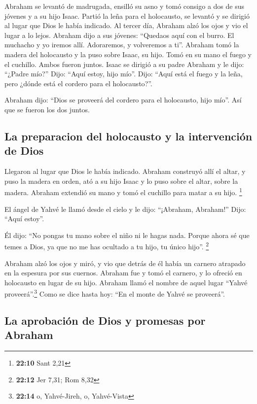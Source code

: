  Abraham se levantó de madrugada, ensilló su asno y tomó
consigo a dos de sus jóvenes y a su hijo Isaac. Partió la leña para el
holocausto, se levantó y se dirigió al lugar que Dios le había indicado.
 Al tercer día, Abraham alzó los ojos y vio el lugar a lo
lejos.  Abraham dijo a sus jóvenes: ``Quedaos aquí con el
burro. El muchacho y yo iremos allí. Adoraremos, y volveremos a ti''.
 Abraham tomó la madera del holocausto y la puso sobre
Isaac, su hijo. Tomó en su mano el fuego y el cuchillo. Ambos fueron
juntos.  Isaac se dirigió a su padre Abraham y le dijo:
``¿Padre mío?'' Dijo: ``Aquí estoy, hijo mío''. Dijo: ``Aquí está el
fuego y la leña, pero ¿dónde está el cordero para el holocausto?''.

 Abraham dijo: ``Dios se proveerá del cordero para el
holocausto, hijo mío''. Así que se fueron los dos juntos.

\hypertarget{la-preparacion-del-holocausto-y-la-intervenciuxf3n-de-dios}{%
\subsection{La preparacion del holocausto y la intervención de
Dios}\label{la-preparacion-del-holocausto-y-la-intervenciuxf3n-de-dios}}

 Llegaron al lugar que Dios le había indicado. Abraham
construyó allí el altar, y puso la madera en orden, ató a su hijo Isaac
y lo puso sobre el altar, sobre la madera.  Abraham
extendió su mano y tomó el cuchillo para matar a su hijo. \footnote{\textbf{22:10}
  Sant 2,21}

 El ángel de Yahvé le llamó desde el cielo y le dijo:
``¡Abraham, Abraham!'' Dijo: ``Aquí estoy''.

 Él dijo: ``No pongas tu mano sobre el niño ni le hagas
nada. Porque ahora sé que temes a Dios, ya que no me has ocultado a tu
hijo, tu único hijo''. \footnote{\textbf{22:12} Jer 7,31; Rom 8,32}

 Abraham alzó los ojos y miró, y vio que detrás de él
había un carnero atrapado en la espesura por sus cuernos. Abraham fue y
tomó el carnero, y lo ofreció en holocausto en lugar de su hijo.
 Abraham llamó el nombre de aquel lugar ``Yahvé
proveerá''.\footnote{\textbf{22:14} o, Yahvé-Jireh, o, Yahvé-Vista} Como
se dice hasta hoy: ``En el monte de Yahvé se proveerá''.

\hypertarget{la-aprobaciuxf3n-de-dios-y-promesas-por-abraham}{%
\subsection{La aprobación de Dios y promesas por
Abraham}\label{la-aprobaciuxf3n-de-dios-y-promesas-por-abraham}}


